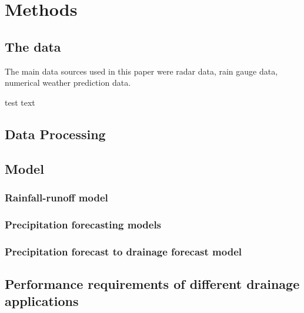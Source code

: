 \chapter{Methods} \label{sec:Methods}

\section{The data}

The main data sources used in this paper were radar data, rain gauge data, numerical weather prediction data. 

test text

\section{Data Processing}
\section{Model}
\subsection{Rainfall-runoff model}
\subsection{Precipitation forecasting models}

\subsection{Precipitation forecast to drainage forecast model}
\section{Performance requirements of different drainage applications}
